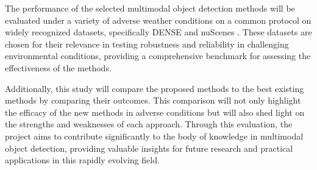 \documentclass[report.tex]{subfiles}
\begin{document}
    The performance of the selected multimodal object detection methods will be evaluated under a variety of adverse weather conditions on a common protocol on widely recognized datasets, specifically DENSE \cite{bijelic2020seeing} and nuScenes \cite{caesar2020nuscenes}. These datasets are chosen for their relevance in testing robustness and reliability in challenging environmental conditions, providing a comprehensive benchmark for assessing the effectiveness of the methods.

    Additionally, this study will compare the proposed methods to the best existing methods by comparing their outcomes. This comparison will not only highlight the efficacy of the new methods in adverse conditions but will also shed light on the strengths and weaknesses of each approach. Through this evaluation, the project aims to contribute significantly to the body of knowledge in multimodal object detection, providing valuable insights for future research and practical applications in this rapidly evolving field.





\end{document}
